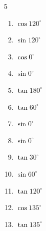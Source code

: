 \begin{multicols}{5}
\begin{enumerate}
\resetques

  \item $\displaystyle \cos{120^\circ}$


  \item $\displaystyle \sin{120^\circ}$


  \item $\displaystyle \cos{0^\circ}$

        \phantom{$\displaystyle =1$}

  \item $\displaystyle \sin{0^\circ}$

        \phantom{$\displaystyle =0$}

  \item $\displaystyle \tan{180^\circ}$

        \phantom{$\displaystyle =0$}

  \item $\displaystyle \tan{60^\circ}$


  \item $\displaystyle \sin{0^\circ}$

        \phantom{$\displaystyle =0$}

  \item $\displaystyle \sin{0^\circ}$

        \phantom{$\displaystyle =0$}

  \item $\displaystyle \tan{30^\circ}$


  \item $\displaystyle \sin{60^\circ}$


  \item $\displaystyle \tan{120^\circ}$


  \item $\displaystyle \cos{135^\circ}$


  \item $\displaystyle \tan{135^\circ}$


\end{enumerate}
\end{multicols}
